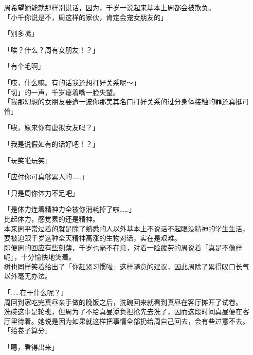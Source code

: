 周希望她能就那样别说话，因为，千岁一说起来基本上周都会被欺负。\\

「小千你说是不，周这样的家伙，肯定会宠女朋友的」

「别多嘴」

「唉？什么？周有女朋友！？」

「有个毛啊」

「哎，什么嘛。有的话我还想打好关系呢～」\\

「切」的一声，千岁瘪着嘴一脸失望。\\

「我那幻想的女朋友要遭一波你那美其名曰打好关系的过分身体接触的罪还真挺可怜」

「唉，原来你有虚拟女友吗？」

「我是说假如有的话好吧！？」

「玩笑啦玩笑」

「应付你可真够累人的……」

「只是周你体力不足吧」

「是体力连着精神力全被你消耗掉了啦……」\\

比起体力，感觉累的还是精神。\\

本来周平常过着的就是除了熟悉的人以外基本上不说话不起眼没精神的学生生活，要被迫跟千岁这种全天精神高涨的生物对话，实在是艰难。\\%

即便周的回应有些刻薄，千岁也毫不在意，对着一脸疲劳的周说着「真是不像样呢」，十分愉快地笑着。\\

树也同样笑着给出了「你赶紧习惯啦」这样随意的建议，因此周除了累得叹口长气以外毫无办法。\\

\vspace{2\baselineskip}

「……在干什么呢？」\\

周回到家吃完真昼亲手做的晚饭之后，洗碗回来就看到真昼在客厅摊开了试卷。\\

洗碗这事是轮班，但周为了不给真昼添负担抢先去洗了，因而这段时间真昼便在客厅里待着。她说是因为如果就这样把事情全部扔给周自己回去，会有些过意不去。\\

「给卷子算分」

「嗯，看得出来」\\

